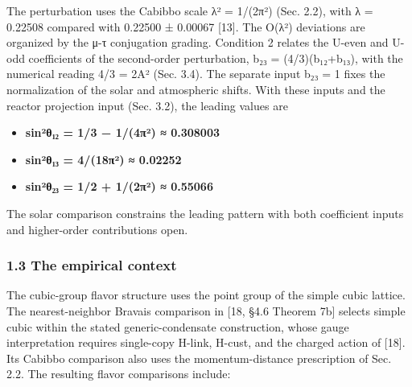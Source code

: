 \documentclass[
]{article}
\providecommand{\tightlist}{%
  \setlength{\itemsep}{0pt}\setlength{\parskip}{0pt}}
\begin{document}
The perturbation uses the Cabibbo scale λ² = 1/(2π²) (Sec. 2.2), with λ
= 0.22508 compared with 0.22500 ± 0.00067 {[}13{]}. The O(λ²) deviations
are organized by the μ-τ conjugation grading. Condition 2 relates the
U-even and U-odd coefficients of the second-order perturbation, b₂₃ =
(4/3)(b₁₂+b₁₃), with the numerical reading 4/3 = 2A² (Sec. 3.4). The
separate input b₂₃ = 1 fixes the normalization of the solar and
atmospheric shifts. With these inputs and the reactor projection input
(Sec. 3.2), the leading values are

\begin{itemize}
\tightlist
\item
  \textbf{sin²θ₁₂ = 1/3 − 1/(4π²) ≈ 0.308003}
\item
  \textbf{sin²θ₁₃ = 4/(18π²) ≈ 0.02252}
\item
  \textbf{sin²θ₂₃ = 1/2 + 1/(2π²) ≈ 0.55066}
\end{itemize}

The solar comparison constrains the leading pattern with both
coefficient inputs and higher-order contributions open.

\hypertarget{the-empirical-context}{%
\subsubsection{1.3 The empirical context}\label{the-empirical-context}}

The cubic-group flavor structure uses the point group of the simple
cubic lattice. The nearest-neighbor Bravais comparison in {[}18, §4.6
Theorem 7b{]} selects simple cubic within the stated generic-condensate
construction, whose gauge interpretation requires single-copy H-link,
H-cust, and the charged action of {[}18{]}. Its Cabibbo comparison also
uses the momentum-distance prescription of Sec. 2.2. The resulting
flavor comparisons include:
\end{document}

